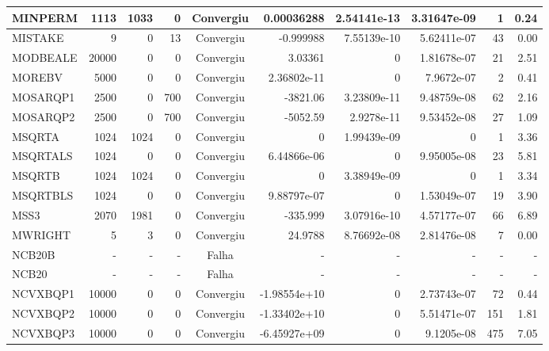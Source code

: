 \begin{center}
\begin{longtable}{|l|r|r|r|c|r|r|r|r|r|}
 MINPERM &   1113 &   1033 &      0 & Convergiu  &  0.00036288 &    2.54141e-13 & 3.31647e-09 &      1 &    0.24 \\ \hline
 MISTAKE &      9 &      0 &     13 & Convergiu  &   -0.999988 &    7.55139e-10 & 5.62411e-07 &     43 &    0.00 \\ \hline
MODBEALE &  20000 &      0 &      0 & Convergiu  &     3.03361 &              0 & 1.81678e-07 &     21 &    2.51 \\ \hline
  MOREBV &   5000 &      0 &      0 & Convergiu  & 2.36802e-11 &              0 &  7.9672e-07 &      2 &    0.41 \\ \hline
MOSARQP1 &   2500 &      0 &    700 & Convergiu  &    -3821.06 &    3.23809e-11 & 9.48759e-08 &     62 &    2.16 \\ \hline
MOSARQP2 &   2500 &      0 &    700 & Convergiu  &    -5052.59 &     2.9278e-11 & 9.53452e-08 &     27 &    1.09 \\ \hline
  MSQRTA &   1024 &   1024 &      0 & Convergiu  &           0 &    1.99439e-09 &           0 &      1 &    3.36 \\ \hline
MSQRTALS &   1024 &      0 &      0 & Convergiu  & 6.44866e-06 &              0 & 9.95005e-08 &     23 &    5.81 \\ \hline
  MSQRTB &   1024 &   1024 &      0 & Convergiu  &           0 &    3.38949e-09 &           0 &      1 &    3.34 \\ \hline
MSQRTBLS &   1024 &      0 &      0 & Convergiu  & 9.88797e-07 &              0 & 1.53049e-07 &     19 &    3.90 \\ \hline
    MSS3 &   2070 &   1981 &      0 & Convergiu  &    -335.999 &    3.07916e-10 & 4.57177e-07 &     66 &    6.89 \\ \hline
 MWRIGHT &      5 &      3 &      0 & Convergiu  &     24.9788 &    8.76692e-08 & 2.81476e-08 &      7 &    0.00 \\ \hline
NCB20B & - & - & - & Falha & - & - & - & - & - \\ \hline
NCB20 & - & - & - & Falha & - & - & - & - & - \\ \hline
NCVXBQP1 &  10000 &      0 &      0 & Convergiu  & -1.98554e+10 &              0 & 2.73743e-07 &     72 &    0.44 \\ \hline
NCVXBQP2 &  10000 &      0 &      0 & Convergiu  & -1.33402e+10 &              0 & 5.51471e-07 &    151 &    1.81 \\ \hline
NCVXBQP3 &  10000 &      0 &      0 & Convergiu  & -6.45927e+09 &              0 &  9.1205e-08 &    475 &    7.05 \\ \hline

\end{longtable}
\end{center}

